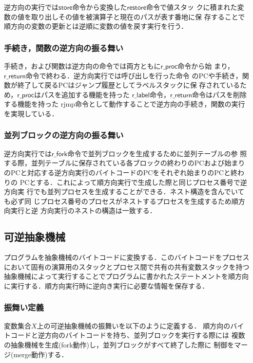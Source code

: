 \documentclass[submit,PRO]{ipsj}
\newcommand{\bcode}[1]{$\mathsf{#1}$}
\begin{document}
逆方向の実行では\bcode{store}命令から変換した\bcode{restore}命令で値スタッ
クに積まれた変数の値を取り出しその値を被演算子と現在のパスが表す番地に保
存することで順方向の変数の更新とは逆順に変数の値を戻す実行を行う．

\subsubsection{手続き，関数の逆方向の振る舞い}

手続き，および関数は逆方向の命令では両方ともに\bcode{r\_proc}命令から始
まり，\bcode{r\_return}命令で終わる．逆方向実行では呼び出しを行った命令
のPCや手続き，関数が終了して戻るPCはジャンプ履歴としてラベルスタックに保
存されているため，\bcode{r\_proc}はパスを追加する機能を持った
\bcode{r\_label}命令，\bcode{r\_return}命令はパスを削除する機能を持った
rjmp命令として動作することで逆方向の手続き，関数の実行を実現している．

\subsubsection{並列ブロックの逆方向の振る舞い}

逆方向実行では\bcode{r\_fork}命令で並列ブロックを生成するために並列テーブルの参
照する際，並列テーブルに保存されている各ブロックの終わりのPCおよび始まり
のPCと対応する逆方向実行のバイトコードのPCをそれぞれ始まりのPCと終わりの
PCとする．これによって順方向実行で生成した際と同じプロセス番号で逆方向実
行でも並列プロセスを生成することができる．ネスト構造を含んでいても必ず同
じプロセス番号のプロセスがネストするプロセスを生成するため順方向実行と逆
方向実行のネストの構造は一致する．

\subsection{可逆抽象機械}
\label{sec:format}

プログラムを抽象機械のバイトコードに変換する．このバイトコードをプロセスにおいて固有の演算用のスタックとプロセス間で共有の共有変数スタックを持つ抽象機械によって実行することでプログラムに書かれたステートメントを順方向に実行する．順方向実行時に逆向き実行に必要な情報を保存する．

\subsubsection{振舞い定義}

変数集合$X$上の可逆抽象機械の振舞いを以下のように定義する．
順方向のバイトコードと逆方向のバイトコードを持ち、並列ブロックを実行する際には
複数の抽象機械を生成(fork動作)し，並列ブロックがすべて終了した際に
制御をマージ(merge動作)する．
\end{document}
